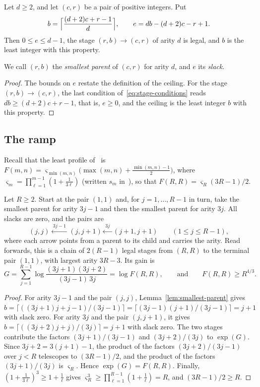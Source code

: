 \begin{lemma}\label{lem:smallest-parent}
Let \(d\ge2\), and let \((c,r)\) be a pair of positive integers. Put
\[
 b=\Bigl\lceil\frac{(d+2)c+r-1}{d}\Bigr\rceil,\qquad
 e=db-(d+2)c-r+1 .
\]
Then \(0\le e\le d-1\), the stage \((r,b)\to(c,r)\) of arity \(d\) is
legal, and \(b\) is the least integer with this property.
\end{lemma}

We call \((r,b)\) the \emph{smallest parent} of \((c,r)\) for arity
\(d\), and \(e\) its \emph{slack}.

\begin{proof}
The bounds on \(e\) restate the definition of the ceiling. For the
stage \((r,b)\to(c,r)\), the last condition of~\eqref{eq:stage-conditions}
reads \(db\ge(d+2)c+r-1\), that is, \(e\ge0\), and the ceiling is the
least integer \(b\) with this property.
\end{proof}

\subsection{The ramp}
\label{subsec:chains-ramp}

Recall that the least profile of~\citep[(3.4)]{FinCon26} is
\(F(m,n)=\varsigma_{\min(m,n)}\bigl(\max(m,n)+\frac{\min(m,n)-1}2\bigr)\),
where \(\varsigma_m=\prod_{\ell=1}^{m-1}(1+\frac1{3\ell})\) (written \(s_m\)
in~\citep{FinCon26}), so that \(F(R,R)=\varsigma_R(3R-1)/2\).

\begin{lemma}\label{lem:ramp}
Let \(R\ge2\). Start at the pair \((1,1)\) and, for
\(j=1,\ldots,R-1\) in turn, take the smallest parent for arity \(3j-1\)
and then the smallest parent for arity \(3j\). All slacks are zero, and
the pairs are
\[
 (j,j)\xleftarrow{\;3j-1\;}(j,j+1)\xleftarrow{\;3j\;}(j+1,j+1)
 \qquad(1\le j\le R-1),
\]
where each arrow points from a parent to its child and carries the
arity. Read forwards, this is a chain of \(2(R-1)\) legal stages from
\((R,R)\) to the terminal pair \((1,1)\), with largest arity \(3R-3\).
Its gain is
\[
 G=\sum_{j=1}^{R-1}\log\frac{(3j+1)(3j+2)}{(3j-1)\,3j}=\log F(R,R),
 \qquad\text{and}\qquad F(R,R)\ge R^{4/3}.
\]
\end{lemma}

\begin{proof}
For arity \(3j-1\) and the pair \((j,j)\),
Lemma~\ref{lem:smallest-parent} gives
\(b=\lceil((3j+1)j+j-1)/(3j-1)\rceil=\lceil(3j-1)(j+1)/(3j-1)\rceil=j+1\)
with slack zero. For arity \(3j\) and the pair \((j,j+1)\), it gives
\(b=\lceil((3j+2)j+j)/(3j)\rceil=j+1\) with slack zero. The two stages
contribute the factors \((3j+1)/(3j-1)\) and \((3j+2)/(3j)\) to
\(\exp(G)\). Since \(3j+2=3(j+1)-1\), the product of the factors
\((3j+2)/(3j-1)\) over \(j<R\) telescopes to \((3R-1)/2\), and the
product of the factors \((3j+1)/(3j)\) is \(\varsigma_R\). Hence
\(\exp(G)=F(R,R)\). Finally, \((1+\frac1{3\ell})^3\ge1+\frac1\ell\)
gives \(\varsigma_R^3\ge\prod_{\ell=1}^{R-1}(1+\frac1\ell)=R\), and
\((3R-1)/2\ge R\).
\end{proof}

